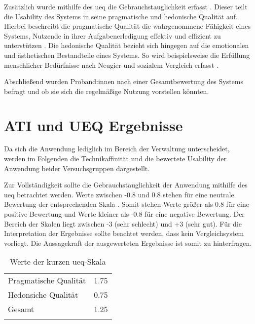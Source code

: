 Zusätzlich wurde mithilfe des \ac{ueq} die Gebrauchstauglichkeit erfasst
\cite{laugwitz2009subjektive}. Dieser teilt die Usability des Systems in seine pragmatische und
hedonische Qualität auf. Hierbei beschreibt die pragmatische Qualität die wahrgenommene Fähigkeit
eines Systems, Nutzende in ihrer Aufgabenerledigung effektiv und effizient zu unterstützen
\cite{hassenzahl_thing_2004}. Die hedonische Qualität bezieht sich hingegen auf die emotionalen und
ästhetischen Bestandteile eines Systems. So wird beispielsweise die Erfüllung menschlicher
Bedürfnisse nach Neugier und sozialem Vergleich erfasst \cite{hassenzahl_thing_2004}.

Abschließend wurden Proband:innen nach einer Gesamtbewertung des Systems befragt und ob sie sich die
regelmäßige Nutzung vorstellen könnten.



\section{ATI und UEQ Ergebnisse}
\label{sec:prese}
Da sich die Anwendung lediglich im Bereich der Verwaltung unterscheidet, werden im
Folgenden die Technikaffinität und die bewertete Usability der Anwendung beider
Versuchsgruppen dargestellt.

Zur Vollständigkeit sollte die Gebrauchstauglichkeit der Anwendung mithilfe des \ac{ueq} betrachtet
werden. Werte zwischen -0.8 und 0.8 stehen für eine neutrale Bewertung der entsprechenden Skala
\cite{schrepp2018user}. Somit stehen Werte größer als 0.8 für eine positive Bewertung und Werte
kleiner als -0.8 für eine negative Bewertung. Der Bereich der Skalen liegt zwischen -3 (sehr
schlecht) und +3 (sehr gut). Für die Interpretation der Ergebnisse sollte beachtet werden, dass kein
Vergleichsystem vorliegt. Die Aussagekraft der ausgewerteten Ergebnisse ist somit zu hinterfragen.
\begin{table}[h]
        \centering
        \caption{Werte der kurzen \ac{ueq}-Skala}
        \begin{tabular}{lc}
                \arrayrulecolor{maincolor}\hline
                Pragmatische Qualität & 1.75 \\
                Hedonsiche Qualität   & 0.75 \\
                Gesamt                & 1.25 \\
                \arrayrulecolor{maincolor}\hline
        \end{tabular}
        \label{table:ueq}
\end{table}


